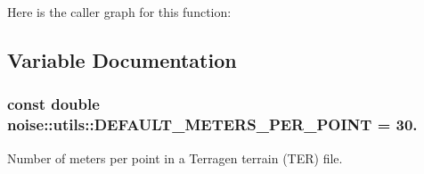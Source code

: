 Here is the caller graph for this function\+:




\subsection{Variable Documentation}
\hypertarget{namespacenoise_1_1utils_a3c693dbdf176e936476e321a63f24859}{
\subsubsection[{D\+E\+F\+A\+U\+L\+T\+\_\+\+M\+E\+T\+E\+R\+S\+\_\+\+P\+E\+R\+\_\+\+P\+O\+I\+N\+T}]{\setlength{\rightskip}{0pt plus 5cm}const double noise\+::utils\+::\+D\+E\+F\+A\+U\+L\+T\+\_\+\+M\+E\+T\+E\+R\+S\+\_\+\+P\+E\+R\+\_\+\+P\+O\+I\+N\+T = 30.}}\label{namespacenoise_1_1utils_a3c693dbdf176e936476e321a63f24859}


Number of meters per point in a Terragen terrain (T\+E\+R) file. 

